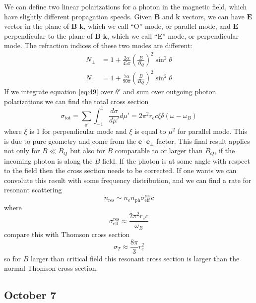 \documentclass[letterpaper, 11pt]{article}
\numberwithin{equation}{section}
\numberwithin{figure}{section}
\begin{document}
We can define two linear polarizations for a photon in the magnetic field, which have slightly different propagation speeds. Given $\boldsymbol{B}$ and $\boldsymbol{k}$ vectors, we can have $\boldsymbol{E}$ vector in the plane of $\boldsymbol{B}$-$\boldsymbol{k}$, which we call ``O'' mode, or parallel mode, and $\boldsymbol{E}$ perpendicular to the plane of $\boldsymbol{B}$-$\boldsymbol{k}$, which we call ``E'' mode, or perpendicular mode. The refraction indices of these two modes are different:
\begin{align}
    \label{eq:50}
  N_{\perp} &= 1 + \frac{2\alpha}{45\pi} \left( \frac{B}{B_Q} \right)^2\sin^2\theta \\
  N_{\parallel} &= 1 + \frac{7\alpha}{90\pi} \left( \frac{B}{B_Q} \right)^2\sin^2\theta
\end{align}
If we integrate equation \eqref{eq:49} over $\theta'$ and sum over outgoing photon polarizations we can find the total cross section
\begin{equation}
    \label{eq:51}
    \sigma_\mathrm{tot} = \sum_{\boldsymbol{e}'}\int_{-1}^1\frac{d\sigma}{d\mu'}d\mu' = 2\pi^2 r_e c\xi \delta(\omega - \omega_B)
\end{equation}
where $\xi$ is 1 for perpendicular mode and $\xi$ is equal to $\mu^2$ for parallel mode. This is due to pure geometry and come from the $\boldsymbol{e}\cdot \boldsymbol{e}_{\pm}$ factor. This final result applies not only for $B\ll B_Q$ but also for $B$ comparable to or larger than $B_Q$, if the incoming photon is along the $B$ field. If the photon is at some angle with respect to the field then the cross section needs to be corrected. If one wants we can convolute this result with some frequency distribution, and we can find a rate for resonant scattering
\begin{equation}
    \label{eq:52}
    \dot{n}_\mathrm{res} \sim n_e n_\mathrm{ph}\sigma^\mathrm{res}_\mathrm{eff}c
\end{equation}
where
\begin{equation}
    \label{eq:53}
    \sigma^\mathrm{res}_\mathrm{eff} \approx \frac{2\pi^2r_ec}{\omega_B}
\end{equation}
compare this with Thomson cross section
\begin{equation}
    \label{eq:54}
    \sigma_T \approx \frac{8\pi}{3}r_e^{2}
\end{equation}
so for $B$ larger than critical field this resonant cross section is larger than the normal Thomson cross section.

\subsection{October 7}
\label{sec:oct-7}
\end{document}
